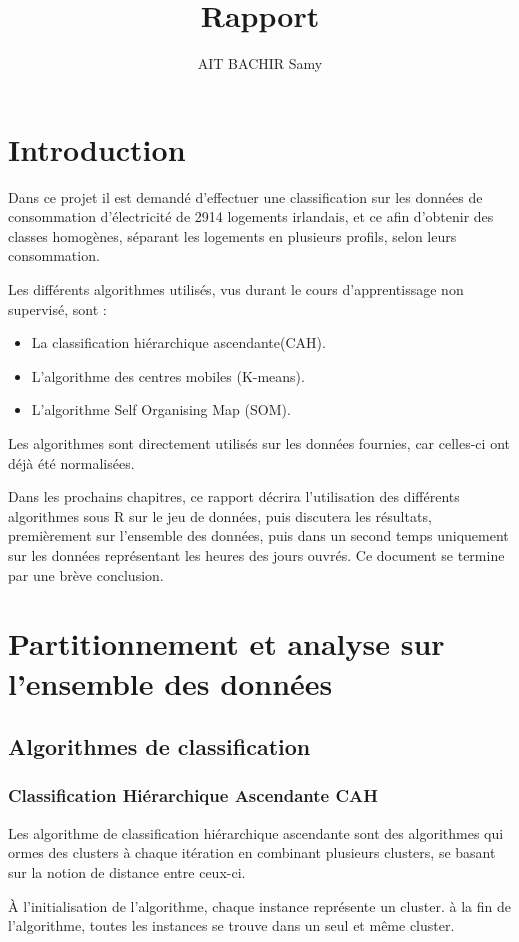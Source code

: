 \documentclass[a4paper,titlepage,12pt]{report}
\title{Rapport}
\author{AIT BACHIR Samy}
\begin{document}
\chapter{Introduction}
	Dans ce projet il est demandé d'effectuer une classification sur les données de consommation d'électricité de 2914 logements irlandais, et ce afin d'obtenir des classes homogènes, séparant les logements en plusieurs profils, selon leurs consommation.\newline
	
	Les différents algorithmes utilisés, vus durant le cours d'apprentissage non supervisé, sont :
	\begin{itemize}
		\item La classification hiérarchique ascendante(CAH).
		\item L'algorithme des centres mobiles (K-means).
		\item L'algorithme Self Organising Map (SOM).
	\end{itemize}
	
	Les algorithmes sont directement utilisés sur les données fournies, car celles-ci ont déjà été normalisées.\newline
	
	Dans les prochains chapitres, ce rapport décrira l'utilisation des différents algorithmes sous R sur le jeu de données, puis discutera les résultats, premièrement sur l'ensemble des données, puis dans un second temps uniquement sur les données représentant les heures des jours ouvrés. Ce document se termine par une brève conclusion. 
	 
\chapter{Partitionnement et analyse sur l'ensemble des données}
	\section{Algorithmes de classification}
		\subsection{Classification Hiérarchique Ascendante CAH}
			Les algorithme de classification hiérarchique ascendante sont des algorithmes qui ormes des clusters à chaque itération en combinant plusieurs clusters, se basant sur la notion de distance entre ceux-ci.
			
			À l'initialisation de l'algorithme, chaque instance représente un cluster. à la fin de l'algorithme, toutes les instances se trouve dans un seul et même cluster.
			
\end{document}
